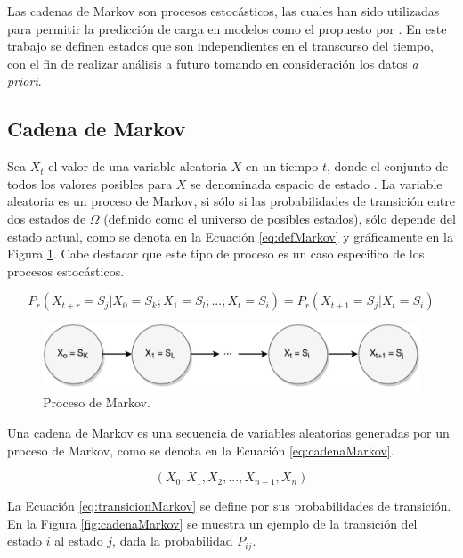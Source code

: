 Las cadenas de Markov son procesos estocásticos, las cuales han sido utilizadas para permitir la predicción de carga en modelos como el propuesto por \citep{GongGW10}. En este trabajo se definen estados que son independientes en el transcurso del tiempo, con el fin de realizar análisis a futuro tomando en consideración los datos \textit{a priori}.

\subsection{Cadena de Markov}
\label{subsec:cadenaMarkov}

Sea $X_t$ el valor de una variable aleatoria $X$ en un tiempo $t$, donde el conjunto de todos los valores posibles para $X$ se denominada espacio de estado \citep{ching2006markov}. La variable aleatoria es un proceso de Markov, si sólo si las probabilidades de transición entre dos estados de $\Omega$ (definido como el universo de posibles estados), sólo depende del estado actual, como se denota en la Ecuación \ref{eq:defMarkov} y gráficamente en la Figura \ref{fig:procesoMarkov}. Cabe destacar que este tipo de proceso es un caso específico de los procesos estocásticos.

\begin{equation} \label{eq:defMarkov} 
	P_r(X_{t+r} = S_j | X_0 = S_k ; X_1 = S_l ; ... ; X_t = S_i) = P_r(X_{t+1} = S_j | X_t = S_i)
\end{equation}

\begin{figure}[ht!]
  \centering
    \includegraphics[scale=0.6]{images/ProcesoMarkov.pdf}
  \caption{Proceso de Markov.}
  \label{fig:procesoMarkov}
\end{figure}

Una cadena de Markov es una secuencia de variables aleatorias generadas por un proceso de Markov, como se denota en la Ecuación \ref{eq:cadenaMarkov}.

\begin{equation} \label{eq:cadenaMarkov}
	(X_0, X_1, X_2, ..., X_{n-1}, X_{n})
\end{equation}

La Ecuación \ref{eq:transicionMarkov} se define por sus probabilidades de transición. En la Figura \ref{fig:cadenaMarkov} se muestra un ejemplo de la transición del estado $i$ al estado $j$, dada la probabilidad $P_{ij}$.

